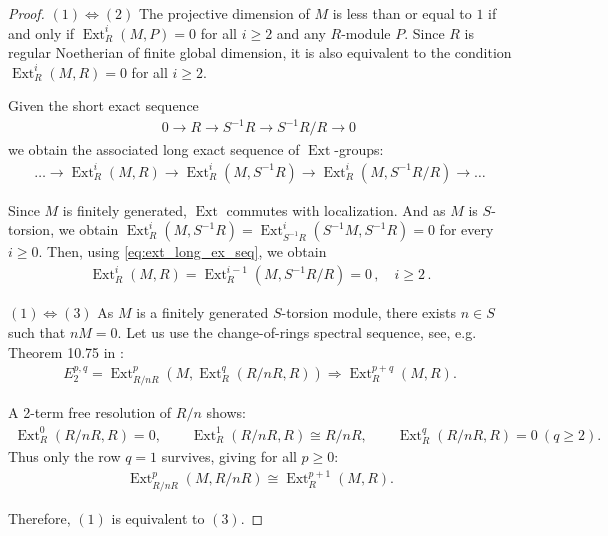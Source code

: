 \documentclass[sn-mathphys-num]{sn-jnl}
\theoremstyle{definition}
\numberwithin{equation}{section}
\theoremstyle{definition}
\def\ext{\operatorname{Ext}}
\begin{document}
\begin{proof}
$(1)\Leftrightarrow (2)$ The projective dimension of $M$ is less than or equal to $1$ if and only if $\ext^i_R(M,P)=0$ for all $i\geqslant 2$ and any $R$-module $P$. Since $R$ is regular Noetherian of finite global dimension, it is also equivalent to the condition $\ext^i_R(M,R)=0$ for all $i\geqslant 2$.

Given the short exact sequence 
\begin{align}
    0\longrightarrow R\longrightarrow S^{-1}R\longrightarrow S^{-1}R/R\longrightarrow0\,
\end{align}
we obtain the associated long exact sequence of $\ext$-groups:
\begin{align}\label{eq:ext_long_ex_seq}
\ldots \longrightarrow\ext_R^i(M,R)\longrightarrow \ext_R^i(M,S^{-1}R)\longrightarrow \ext_R^i(M,S^{-1}R/R)\longrightarrow\ldots  
\end{align}

 Since $M$ is finitely generated, $\ext$ commutes with localization. And as $M$ is $S$-torsion, we obtain $\ext^i_R(M,S^{-1}R)=\ext^i_{S^{-1}R}(S^{-1}M,S^{-1}R)=0$ for every $i\geqslant0$. Then, using \eqref{eq:ext_long_ex_seq}, we obtain
\begin{align}
   \ext_R^{i}(M,R)=\ext_R^{i-1}(M,S^{-1}R/R)=0 \,,\quad i\geqslant 2\,. 
\end{align}

$(1)\Leftrightarrow (3)$ 
As $M$ is a finitely generated $S$-torsion module, there exists $n\in S$ such that $n M=0$. Let us use the  change-of-rings spectral sequence, see, e.g. Theorem 10.75 in \cite{rotman2009introduction}:
\begin{align} 
E_2^{p,q}
=
\operatorname{Ext}^p_{R/nR}(M, \operatorname{Ext}^q_R(R/nR,R))
\Longrightarrow
\operatorname{Ext}^{p+q}_R(M,R).
\end{align} 

A 2-term free resolution of \(R/n\) shows:
\begin{align} 
\operatorname{Ext}^0_R(R/nR,R)=0,\qquad
\operatorname{Ext}^1_R(R/nR,R)\cong R/nR,\qquad
\operatorname{Ext}^q_R(R/nR,R)=0 \ (q\ge 2).
\end{align} 
Thus only the row \( q=1 \) survives, giving for all \( p\ge 0 \):
\begin{align}\label{ext_shift}
\operatorname{Ext}^p_{R/nR}(M,R/nR)
\cong
\operatorname{Ext}^{p+1}_R(M,R).
\end{align}

Therefore, $(1)$ is equivalent to $(3)$.
\end{proof}
\end{document}
